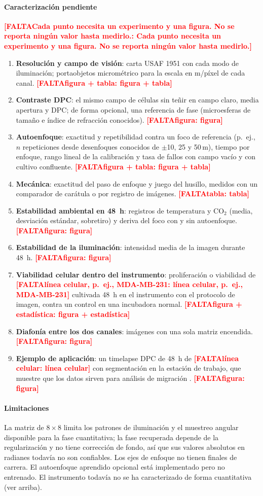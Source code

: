 \documentclass[preprint,12pt]{elsarticle}
\DeclareRobustCommand{\TODO}[1]{\textcolor{red}{\textbf{[FALTA\ifx\relax#1\relax\else: #1\fi]}}}
\newcommand{\um}{\,\textmu m}
\begin{document}
\paragraph{Caracterización pendiente}
\TODO{Cada punto necesita un experimento y una figura. No se reporta
ningún valor hasta medirlo.}
\begin{enumerate}
\item \textbf{Resolución y campo de visión}: carta USAF 1951 con cada modo
  de iluminación; portaobjetos micrométrico para la escala en
  \textmu m/píxel de cada canal. \TODO{figura + tabla}
\item \textbf{Contraste DPC}: el mismo campo de células sin teñir en campo
  claro, media apertura y DPC; de forma opcional, una referencia de fase
  (microesferas de tamaño e índice de refracción conocidos).
  \TODO{figura}
\item \textbf{Autoenfoque}: exactitud y repetibilidad contra un foco de
  referencia (p.~ej., $n$ repeticiones desde desenfoques conocidos de
  $\pm$10, 25 y 50\um), tiempo por enfoque, rango lineal de la calibración
  y tasa de fallos con campo vacío y con cultivo confluente.
  \TODO{figura + tabla}
\item \textbf{Mecánica}: exactitud del paso de enfoque y juego del husillo,
  medidos con un comparador de carátula o por registro de imágenes.
  \TODO{tabla}
\item \textbf{Estabilidad ambiental en 48~h}: registros de temperatura y
  CO$_2$ (media, desviación estándar, sobretiro) y deriva del foco con y
  sin autoenfoque. \TODO{figura}
\item \textbf{Estabilidad de la iluminación}: intensidad media de la imagen
  durante 48~h. \TODO{figura}
\item \textbf{Viabilidad celular dentro del instrumento}: proliferación o
  viabilidad de \TODO{línea celular, p.~ej., MDA-MB-231} cultivada 48~h en
  el instrumento con el protocolo de imagen, contra un control en una
  incubadora normal. \TODO{figura + estadística}
\item \textbf{Diafonía entre los dos canales}: imágenes con una sola
  matriz encendida. \TODO{figura}
\item \textbf{Ejemplo de aplicación}: un timelapse DPC de 48~h de
  \TODO{línea celular} con segmentación en la estación de trabajo, que
  muestre que los datos sirven para análisis de migración
  \cite{WuWirtz2026Methods}. \TODO{figura}
\end{enumerate}

\paragraph{Limitaciones} La matriz de $8\times8$ limita los patrones de
iluminación y el muestreo angular disponible para la fase cuantitativa; la
fase recuperada depende de la regularización y no tiene corrección de
fondo, así que sus valores absolutos en radianes todavía no son
confiables. Los ejes de enfoque no tienen finales de carrera. El
autoenfoque aprendido opcional está implementado pero no entrenado. El
instrumento todavía no se ha caracterizado de forma cuantitativa (ver
arriba).
\end{document}
